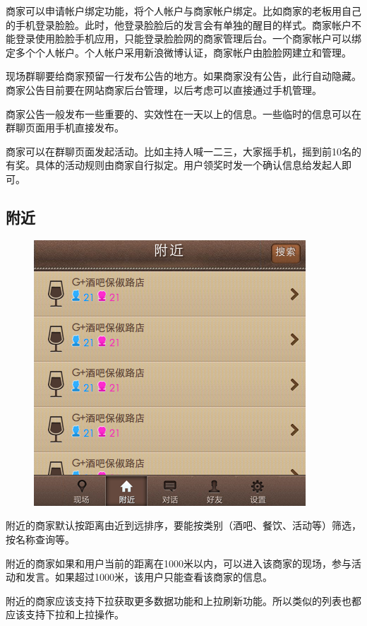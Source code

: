 \documentclass[cs4size]{ctexartutf8}
\begin{document}
商家可以申请帐户绑定功能，将个人帐户与商家帐户绑定。比如商家的老板用自己的手机登录脸脸。此时，他登录脸脸后的发言会有单独的醒目的样式。商家帐户不能登录使用脸脸手机应用，只能登录脸脸网的商家管理后台。一个商家帐户可以绑定多个个人帐户。个人帐户采用新浪微博认证，商家帐户由脸脸网建立和管理。

现场群聊要给商家预留一行发布公告的地方。如果商家没有公告，此行自动隐藏。商家公告目前要在网站商家后台管理，以后考虑可以直接通过手机管理。

商家公告一般发布一些重要的、实效性在一天以上的信息。一些临时的信息可以在群聊页面用手机直接发布。


商家可以在群聊页面发起活动。比如主持人喊一二三，大家摇手机，摇到前10名的有奖。具体的活动规则由商家自行拟定。用户领奖时发一个确认信息给发起人即可。


\subsection{附近}

\begin{figure}[H]
\centering
\includegraphics[scale=0.5]{./5.png}
\end{figure}

附近的商家默认按距离由近到远排序，要能按类别（酒吧、餐饮、活动等）筛选，按名称查询等。

附近的商家如果和用户当前的距离在1000米以内，可以进入该商家的现场，参与活动和发言。如果超过1000米，该用户只能查看该商家的信息。

附近的商家应该支持下拉获取更多数据功能和上拉刷新功能。所以类似的列表也都应该支持下拉和上拉操作。
\end{document}
